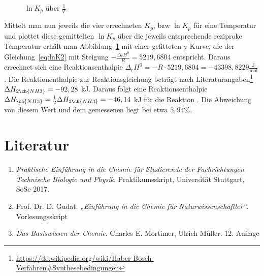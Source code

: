 \documentclass{scrartcl}
\begin{document}
\begin{figure}\label{fig:plot}
	\centering
	\caption{$\ln{K_p}$ über $\frac{1}{T}$}
	
\end{figure}
Mittelt man nun jeweils die vier errechneten $K_p$, bzw $\ln{K_p}$ für eine Temperatur und plottet diese gemittelten $\ln{K_p}$ über die jeweils entsprechende reziproke Temperatur erhält man Abbildung~\ref{fig:plot} mit einer gefitteten y Kurve, die der Gleichung~\ref{eq:lnK2} mit Steigung $-\frac{\Delta_r H^0}{R} = 5219,6804$ entspricht. Daraus errechnet sich eine Reaktionsenthalpie $\Delta_r H^0 = -R\cdot 5219,6804= -43398,8229 \frac{\text{J}}{\text{mol}}$. Die Reaktionenthalpie zur Reaktionsgleichung  beträgt nach Literaturangaben\footnote{\url{https://de.wikipedia.org/wiki/Haber-Bosch-Verfahren#Synthesebedingungen}} $\Delta H_{2\ch{NH3}} = -92,28$ kJ. Daraus folgt eine Reaktionsenthalpie $\Delta H_{\ch{NH3}} =\frac{1}{2} \Delta H_{2\ch{NH3}} = -46,14$ kJ für die Reaktion . Die Abweichung von diesem Wert und dem gemessenen liegt bei etwa $5,94\%$.
\section{Literatur}
\begin{enumerate}[label=(\arabic*)]
	\item \emph{Praktische Einführung in die Chemie
für Studierende der Fachrichtungen
Technische Biologie und Physik}. Praktikumsskript, Universität Stuttgart,
SoSe 2017.  
	\item Prof. Dr. D. Gudat. \emph{„Einführung in die Chemie für Naturwissenschaftler“}. Vorlesungsskript
	\item \emph{Das Basiswissen der Chemie}. Charles E. Mortimer, Ulrich Müller. 12. Auflage
\end{enumerate}
\end{document}
